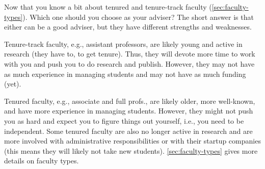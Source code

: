 \documentclass[oneside,11pt,dvipsnames]{book}
\newenvironment{commentbox}[1][]{
  \small
  \begin{mybox}
    {\small \textbf{#1}}
  }{
  \end{mybox}
}
\begin{document}
Now that you know a bit about tenured and tenure-track faculty (\autoref{sec:faculty-types}).  Which one should you choose as your adviser? The short answer is that either can be a good adviser, but they have different strengths and weaknesses.

Tenure-track faculty, e.g., assistant professors, are likely young and active in research (they have to, to get tenure). Thus, they will devote more time to work with you and push you to do research and publish. However, they may not have as much experience in managing students and may not have as much funding (yet).

Tenured faculty, e.g., associate and full profs., are likely older, more well-known, and have more experience in managing students.  However, they might not push you as hard and expect you to figure things out yourself, i.e., you need to be independent.  Some tenured faculty are also no longer active in research and are more involved with administrative responsibilities or with their startup companies (this means they will likely not take new students). \autoref{sec:faculty-types} gives more details on faculty types.


\end{document}
